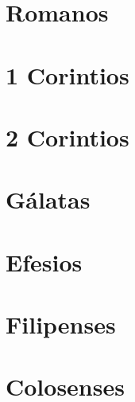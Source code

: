 \chapter{Romanos}
\begin{multicols}{2}
  \raggedcolumns
  \parskip=0pt \relax
  
\end{multicols}

\chapter{1 Corintios}
\begin{multicols}{2}
  \raggedcolumns
  \parskip=0pt \relax
  
\end{multicols}

\chapter{2 Corintios}
\begin{multicols}{2}
  \raggedcolumns
  \parskip=0pt \relax
  
\end{multicols}

\chapter{Gálatas}
\begin{multicols}{2}
  \raggedcolumns
  \parskip=0pt \relax
  
\end{multicols}

\chapter{Efesios}
\begin{multicols}{2}
  \raggedcolumns
  \parskip=0pt \relax
  
\end{multicols}

\chapter{Filipenses}
\begin{multicols}{2}
  \raggedcolumns
  \parskip=0pt \relax
  
\end{multicols}

\chapter{Colosenses}
\begin{multicols}{2}
  \raggedcolumns
  \parskip=0pt \relax
  
\end{multicols}

